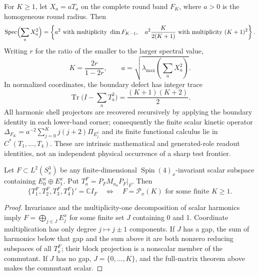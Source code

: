 \documentclass[12pt,a4paper]{article}
\begin{document}
\begin{corollary}
\label{p2c:cor:finite-coordinate-intrinsic-resolution}
For $K\ge1$, let $X_a=aT_a$ on the complete round band $F_K$, where
$a>0$ is the homogeneous round radius. Then
\[
 \operatorname{Spec}\Bigl(\sum_aX_a^2\Bigr)
 =\left\{
 a^2\text{ with multiplicity }\dim F_{K-1},\quad
 a^2\frac{K}{2(K+1)}\text{ with multiplicity }(K+1)^2
 \right\}.
\]
Writing $r$ for the ratio of the smaller to the larger spectral value,
\[
 \boxed{K=\frac{2r}{1-2r},\qquad
 a=\sqrt{\lambda_{\max}(\sum_a X_a^2)}.}
\]
In normalized coordinates, the boundary defect has integer trace
\[
 \boxed{\operatorname{Tr}\bigl(I-\sum_aT_a^2\bigr)
 =\frac{(K+1)(K+2)}2.}
\]
All harmonic shell projectors are recovered recursively by applying
the boundary identity in each lower-band corner; consequently the
finite scalar kinetic operator
$\Delta_{F_K}=a^{-2}\sum_{j=0}^K j(j+2)\Pi_{E_j^x}$
and its finite functional calculus lie in $C^*(T_1,\ldots,T_4)$.
These are intrinsic mathematical and generated-role readout identities,
not an independent physical occurrence of a sharp test frontier.
\end{corollary}

\begin{theorem}
\label{p2c:thm:finite-coordinate-complete-band-criterion}
Let $F\subset L^2(S_x^3)$ be any finite-dimensional
$\operatorname{Spin}(4)_x$-invariant scalar subspace containing
$E_0^x\oplus E_1^x$. Put $T_a^F=P_FM_{u_a}P_F|_F$. Then
\[
 \boxed{\{T_1^F,T_2^F,T_3^F,T_4^F\}'=\mathbb C I_F
 \quad\Longleftrightarrow\quad F=\mathcal P_x(K)
 \text{ for some finite }K\ge1.}
\]
\end{theorem}
\begin{proof}
Invariance and the multiplicity-one decomposition of scalar harmonics
imply $F=\bigoplus_{j\in J}E_j^x$ for some finite set $J$ containing
0 and 1. Coordinate multiplication has only degree $j\mapsto j\pm1$
components. If $J$ has a gap, the sum of harmonics below that gap and
the sum above it are both nonzero reducing subspaces of all $T_a^F$;
their block projection is a nonscalar member of the commutant. If $J$
has no gap, $J=\{0,\ldots,K\}$, and the full-matrix theorem above
makes the commutant scalar.
\end{proof}
\end{document}
